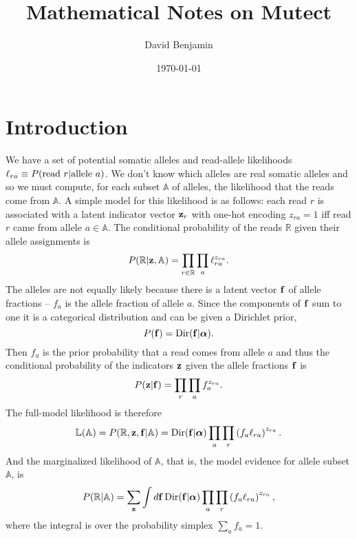 \documentclass[nofootinbib,amssymb,amsmath]{revtex4}
\newcommand{\vf}{{\bf f}}
\newcommand{\vz}{{\bf z}}
\newcommand{\valpha}{{\bm{\alpha}}}
\begin{document}
\title{Mathematical Notes on Mutect}
\author{David Benjamin}

\date{\today}

\maketitle

\section{Introduction}\label{introduction}

We have a set of potential somatic alleles and read-allele likelihoods $\ell_{ra} \equiv P({\rm read~}r|{\rm allele~}a)$.  We don't know which alleles are real somatic alleles and so we must compute, for each subset $\mathbb{A}$ of alleles, the likelihood that the reads come from $\mathbb{A}$.  A simple model for this likelihood is as follows: each read $r$ is associated with a latent indicator vector $\vz_r$ with one-hot encoding $z_{ra} = 1$ iff read $r$ came from allele $a \in \mathbb{A}$.  The conditional probability of the reads $\mathbb{R}$ given their allele assignments is
\begin{equation}
P( \mathbb{R} | \vz, \mathbb{A}) = \prod_{r \in \mathbb{R}} \prod_a \ell_{ra}^{z_{ra}}.
\end{equation}
The alleles are not equally likely because there is a latent vector $\vf$ of allele fractions -- $f_a$ is the allele fraction of allele $a$.  Since the components of $\vf$ sum to one it is a categorical distribution and can be given a Dirichlet prior,
\begin{equation}
P(\vf) = {\rm Dir}(\vf | \valpha).
\end{equation}
Then $f_a$ is the prior probability that a read comes from allele $a$ and thus the conditional probability of the indicators $\vz$ given the allele fractions $\vf$ is
\begin{equation}
P(\vz | \vf) = \prod_r \prod_a f_a^{z_{ra}}.
\end{equation}
The full-model likelihood is therefore
\begin{equation}
\mathbb{L}(\mathbb{A}) = P(\mathbb{R}, \vz, \vf | \mathbb{A}) = {\rm Dir}(\vf | \valpha) \prod_a  \prod_r \left( f_a \ell_{ra}\right)^{z_{ra}}.
\label{full_likelihood}
\end{equation}
And the marginalized likelihood of $\mathbb{A}$, that is, the model evidence for allele subset $\mathbb{A}$, is
\begin{equation}
P(\mathbb{R} | \mathbb{A}) = \sum_\vz \int d \vf \, {\rm Dir}(\vf | \valpha) \prod_a  \prod_r \left( f_a \ell_{ra}\right)^{z_{ra}},
\label{evidence}
\end{equation}
where the integral is over the probability simplex $\sum_a f_a = 1$.
\end{document}
